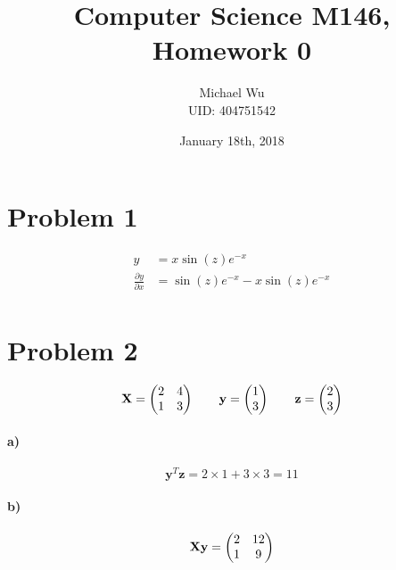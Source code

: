 \documentclass[12pt]{article}
\begin{document}
\title{Computer Science M146, Homework 0}
\date{January 18th, 2018}
\author{Michael Wu\\UID: 404751542}
\maketitle

\section*{Problem 1}

\begin{align*}
        y&=x\sin(z)e^{-x}\\
        \frac{\partial y}{\partial x}&=\sin(z)e^{-x}-x\sin(z)e^{-x}\\
\end{align*}

\section*{Problem 2}

\[\mathbf{X}=\left(
        \begin{array}{@{}cc@{}}
                2&4\\
                1&3
        \end{array}
\right)\qquad
\mathbf{y}=\left(
        \begin{array}{@{}c@{}}
                1\\
                3
        \end{array}
\right)\qquad
\mathbf{z}=\left(
        \begin{array}{@{}c@{}}
                2\\
                3
        \end{array}
\right)
\]

\paragraph{a)}

\[\mathbf{y}^T\mathbf{z}=2\times 1+ 3\times 3 = 11\]

\paragraph{b)}

\[\mathbf{X}\mathbf{y}=\left(
        \begin{array}{@{}cc@{}}
                2&12\\
                1&9
        \end{array}
\right)\]
\end{document}
